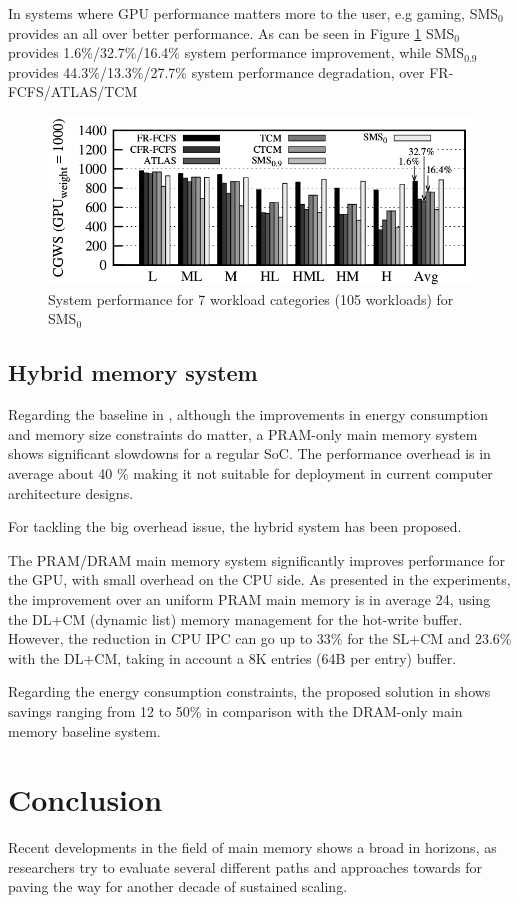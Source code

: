 \documentclass[12pt,journal,compsoc]{IEEEtran}
\begin{document}
In systems where GPU performance matters more to the user, e.g gaming, SMS$_0$ provides an all over better performance.  As can be seen in Figure \ref{fig:SmS_GPU_1000}  SMS$_0$ provides 1.6\%/32.7\%/16.4\% system performance improvement, while SMS$_{0.9}$ provides 44.3\%/13.3\%/27.7\% system performance degradation, over FR-FCFS/ATLAS/TCM

\begin{figure}[H]
	\centering
	\includegraphics[width = 9 cm]{graphics/GPU_W_1000.png}
	\caption{System performance for 7 workload categories (105 workloads) for SMS$_0$ \cite{SmS}}\label{fig:SmS_GPU_1000}
\end{figure}

\subsection{Hybrid memory system}
Regarding the baseline in \cite{PRAM}, although the improvements in energy consumption and memory size constraints do matter, a PRAM-only main memory system shows significant slowdowns for a regular SoC. The performance overhead is in average about 40 \% making it not suitable for deployment in current computer architecture designs. 

For tackling the big overhead issue, the hybrid system has been proposed. 

The PRAM/DRAM main memory system significantly improves performance for the GPU, with small overhead on the CPU side. As presented in the experiments, the improvement over an uniform PRAM main memory is in average 24, using the DL+CM (dynamic list) memory management for the hot-write buffer. However, the reduction in CPU IPC can go up to 33\% for the SL+CM and 23.6\% with the DL+CM, taking in account a 8K entries (64B per entry) buffer\cite{PRAM}. 

Regarding the energy consumption constraints, the proposed solution in \cite{PDRAM} shows savings ranging from 12 to 50\% in comparison with the DRAM-only main memory baseline system.

\section{Conclusion}
Recent developments in the field of main memory shows a broad in horizons, as researchers try to evaluate several different paths and approaches towards for paving the way for another decade of sustained scaling. 
\end{document}
